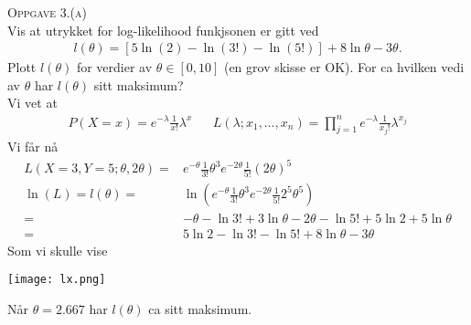\documentclass{article}
\begin{document}
\textsc{Oppgave 3.(a)}\\
Vis at utrykket for log-likelihood funkjsonen er gitt ved
\begin{align*}
  l(\theta) = [5\ln{(2)}-\ln{(3!)}-\ln{(5!)}]+8\ln{\theta}-3\theta.
\end{align*}
Plott $l(\theta)$ for verdier av $\theta\in [0,10]$ (en grov skisse er OK). For
ca hvilken vedi av $\theta$ har $l(\theta)$ sitt maksimum?\\
Vi vet at
\begin{align*}
  P(X=x)=e^{-\lambda}\frac{1}{x!}\lambda^x && L(\lambda; x_1,\ldots, x_n)=\prod_{j=1}^n e^{-\lambda}\frac{1}{x_j!}\lambda^{x_j}
\end{align*}
Vi får nå
\begin{align*}
  L(X=3, Y=5;\theta, 2\theta)=&e^{-\theta}\frac{1}{3!}\theta^3 e^{-2\theta} \frac{1}{5!} (2\theta)^5\\
  \ln{(L)}=l(\theta)=&\ln{\left( e^{-\theta}\frac{1}{3!}\theta^3 e^{-2\theta} \frac{1}{5!} 2^5 \theta^5 \right)}\\
  =& - \theta - \ln{3!} + 3\ln{\theta}-2\theta - \ln{5!}+5\ln{2}+5\ln{\theta}\\
  =& 5 \ln{2}-\ln{3!}-\ln{5!}+ 8\ln{\theta}-3\theta
\end{align*}
Som vi skulle vise
\begin{center}
  \texttt{[image: lx.png]}
\end{center}
Når $\theta=2.667$ har $l(\theta)$ ca sitt maksimum.\\
\end{document}
